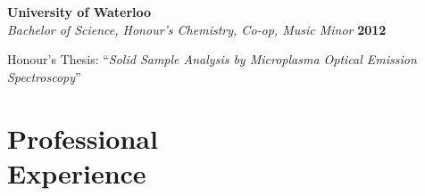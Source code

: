 \documentclass[margin,line]{resumecls}
\begin{document}
\begin{resume}
    \textbf{University of Waterloo}\\\vspace{1mm}%
    \textsl{Bachelor of Science, Honour's Chemistry, Co-op, Music Minor} \hfill \textbf{2012}\vspace{-3mm}\\\vspace{-1mm}%
    \begin{list2}
        \item Honour's Thesis: ``\textit{Solid Sample Analysis by Microplasma Optical Emission Spectroscopy}''
    \end{list2}

    \section{\mysidestyle Professional\\Experience}


\end{resume}
\end{document}
